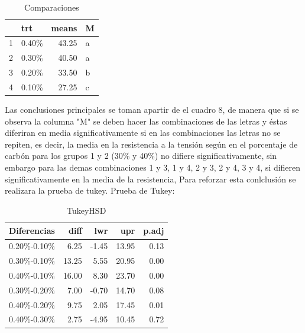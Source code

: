 \documentclass[12pt,letterpaper]{report}
\begin{document}
\begin{table}[ht]
\centering
\begin{tabular}{rlrl}
  \hline
 & trt & means & M \\ 
  \hline
  1 & 0.40\% & 43.25 & a \\ 
  2 & 0.30\% & 40.50 & a \\ 
  3 & 0.20\% & 33.50 & b \\ 
  4 & 0.10\% & 27.25 & c \\ 
   \hline
\end{tabular}
\caption{Comparaciones}
\end{table}

Las conclusiones principales se toman apartir de el cuadro 8, de manera que si se observa la columna "M" se deben hacer las combinaciones de las letras y éstas diferiran en media significativamente si en las combinaciones las letras no se repiten, es decir, la media en la resistencia a la tensión según en el porcentaje de carbón para los grupos 1 y 2 (30\% y 40\%) no difiere significativamente, sin embargo para las demas combinaciones 1 y 3, 1 y 4, 2 y 3, 2 y 4, 3 y 4, si difieren significativamente en la media de la resistencia, Para reforzar esta conlclusión se realizara la prueba de tukey.
\newpage
Prueba de Tukey: 
\begin{Schunk}
\end{Schunk}

\begin{table}[ht]
\centering
\begin{tabular}{rrrrr}
  \hline
 Diferencias  & diff & lwr & upr & p.adj \\ 
  \hline
0.20\%-0.10\% & 6.25 & -1.45 & 13.95 & 0.13 \\ 
  0.30\%-0.10\% & 13.25 & 5.55 & 20.95 & 0.00 \\ 
  0.40\%-0.10\% & 16.00 & 8.30 & 23.70 & 0.00 \\ 
  0.30\%-0.20\% & 7.00 & -0.70 & 14.70 & 0.08 \\ 
  0.40\%-0.20\% & 9.75 & 2.05 & 17.45 & 0.01 \\ 
  0.40\%-0.30\% & 2.75 & -4.95 & 10.45 & 0.72 \\ 
   \hline
\end{tabular}
\caption{TukeyHSD}
\end{table}
\end{document}
